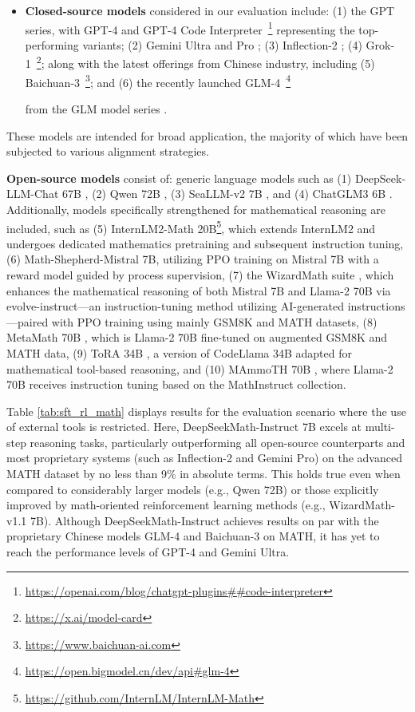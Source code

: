 \begin{itemize}[topsep=0pt]
    \item \textbf{Closed-source models} considered in our evaluation include: (1) the GPT series, with GPT-4 \citep{gpt4} and GPT-4 Code Interpreter~\footnote{\url{https://openai.com/blog/chatgpt-plugins\#\#code-interpreter}} representing the top-performing variants; (2) Gemini Ultra and Pro \citep{gemini}; (3) Inflection-2 \citep{inflection-2}; (4) Grok-1~\footnote{\url{https://x.ai/model-card}};
    along with the latest offerings from Chinese industry, including (5) Baichuan-3~\footnote{\url{https://www.baichuan-ai.com}}; and (6) the recently launched GLM-4~\footnote{\url{https://open.bigmodel.cn/dev/api\#glm-4}}
    
    from the GLM model series \citep{glm}.
\end{itemize}

These models are intended for broad application, the majority of which have been subjected to various alignment strategies.

\item \textbf{Open-source models} consist of: generic language models such as (1) DeepSeek-LLM-Chat 67B \citep{deepseek-llm}, (2) Qwen 72B \citep{qwen}, (3) SeaLLM-v2 7B \citep{seallm}, and (4) ChatGLM3 6B \citep{chatglm3}. Additionally, models specifically strengthened for mathematical reasoning are included, such as (5) InternLM2-Math 20B\footnote{\url{https://github.com/InternLM/InternLM-Math}}, which extends InternLM2 and undergoes dedicated mathematics pretraining and subsequent instruction tuning, (6) Math-Shepherd-Mistral 7B, utilizing PPO training \citep{schulman2017proximal} on Mistral 7B \citep{mistral} with a reward model guided by process supervision, (7) the WizardMath suite \citep{wizardmath}, which enhances the mathematical reasoning of both Mistral 7B and Llama-2 70B \citep{llama2} via evolve-instruct—an instruction-tuning method utilizing AI-generated instructions—paired with PPO training using mainly GSM8K and MATH datasets, (8) MetaMath 70B \citep{metamath}, which is Llama-2 70B fine-tuned on augmented GSM8K and MATH data, (9) ToRA 34B \cite{tora}, a version of CodeLlama 34B adapted for mathematical tool-based reasoning, and (10) MAmmoTH 70B \citep{MathInstruct}, where Llama-2 70B receives instruction tuning based on the MathInstruct collection.

Table \ref{tab:sft_rl_math} displays results for the evaluation scenario where the use of external tools is restricted. Here, DeepSeekMath-Instruct 7B excels at multi-step reasoning tasks, particularly outperforming all open-source counterparts and most proprietary systems (such as Inflection-2 and Gemini Pro) on the advanced MATH dataset by no less than 9\% in absolute terms. This holds true even when compared to considerably larger models (e.g., Qwen 72B) or those explicitly improved by math-oriented reinforcement learning methods (e.g., WizardMath-v1.1 7B). Although DeepSeekMath-Instruct achieves results on par with the proprietary Chinese models GLM-4 and Baichuan-3 on MATH, it has yet to reach the performance levels of GPT-4 and Gemini Ultra.

